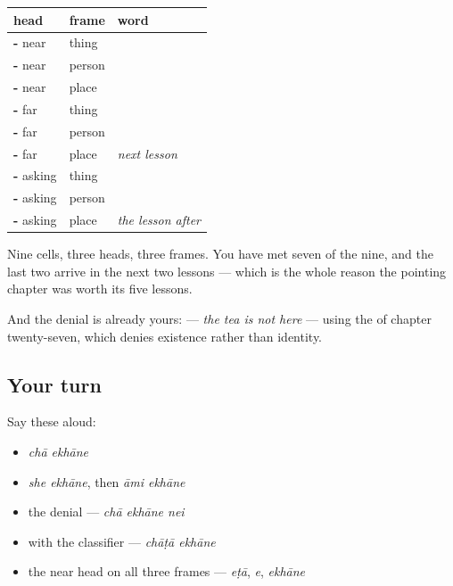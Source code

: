 \begin{grammarlens}[title={Grammar Lens: the grid, now in three dimensions}]
\noindent
\begin{tabularx}{\linewidth}{@{}>{\raggedright\arraybackslash}X>{\raggedright\arraybackslash}X>{\raggedright\arraybackslash}X@{}}
\toprule
\textbf{head} & \textbf{frame} & \textbf{word} \\
\midrule
\textbf{\bn{এ}-} near & thing & \textbf{\bn{এটা}} \\
\textbf{\bn{এ}-} near & person & \textbf{\bn{এ}} \\
\textbf{\bn{এ}-} near & place & \textbf{\bn{এখানে}} \\
\textbf{\bn{ও}-} far & thing & \textbf{\bn{ওটা}} \\
\textbf{\bn{ও}-} far & person & \textbf{\bn{ও}} \\
\textbf{\bn{ও}-} far & place & \emph{next lesson} \\
\textbf{\bn{ক}-} asking & thing & \textbf{\bn{কী}} \\
\textbf{\bn{ক}-} asking & person & \textbf{\bn{কে}} \\
\textbf{\bn{ক}-} asking & place & \emph{the lesson after} \\
\bottomrule
\end{tabularx}

Nine cells, three heads, three frames. You have met seven of the nine, and the last two arrive in the next two lessons — which is the whole reason the pointing chapter was worth its five lessons.

And the denial is already yours: \textbf{  } — \emph{the tea is not here} — using the \textbf{} of chapter twenty-seven, which denies existence rather than identity.
\end{grammarlens}

\subsection*{Your turn}
Say these aloud:

\begin{itemize}
\raggedright
  \item \emph{chā ekhāne}
  \item \emph{she ekhāne}, then \emph{āmi ekhāne}
  \item the denial — \emph{chā ekhāne nei}
  \item with the classifier — \emph{chāṭā ekhāne}
  \item the near head on all three frames — \emph{eṭā}, \emph{e}, \emph{ekhāne}
\end{itemize}

